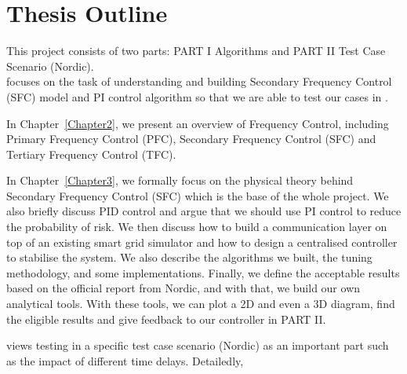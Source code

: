 \section{Thesis Outline} %
This project consists of two parts: PART I Algorithms and PART II Test Case Scenario (Nordic).\\

 focuses on the task of understanding and building Secondary Frequency Control (SFC) model and PI control algorithm so that we are able to test our cases in .

\begin{description}
    \item In Chapter~\ref{Chapter2}, we present an overview of Frequency Control, including Primary Frequency Control (PFC), Secondary Frequency Control (SFC) and Tertiary Frequency Control (TFC). 
    \item In Chapter~\ref{Chapter3}, we formally focus on the physical theory behind Secondary Frequency Control (SFC) which is the base of the whole project. We also briefly discuss PID control and argue that we should use PI control to reduce the probability of risk. We then discuss how to build a communication layer on top of an existing smart grid simulator and how to design a centralised controller to stabilise the system. We also describe the algorithms we built, the tuning methodology, and some implementations. Finally, we define the acceptable results based on the official report from Nordic, and with that, we build our own analytical tools. With these tools, we can plot a 2D and even a 3D diagram, find the eligible results and give feedback to our controller in PART II.
\end{description}

 views testing in a specific test case scenario (Nordic) as an important part such as the impact of different time delays. Detailedly, 

